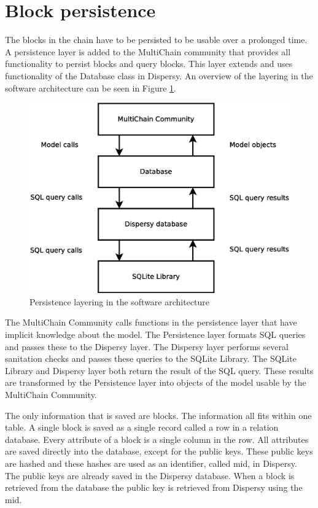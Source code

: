 \section{Block persistence}
The blocks in the chain have to be persisted to be usable over a prolonged time.
A persistence layer is added to the MultiChain community
that provides all functionality to persist blocks and query blocks.
This layer extends and uses functionality of the Database class in Dispersy.
An overview of the layering in the software architecture can be seen in Figure \ref{fig:persistence-layer}.

\begin{figure}
	\centerline{\includegraphics[scale=0.3]{design/figs/persistence-layer.eps}}
	\caption{Persistence layering in the software architecture}
	\label{fig:persistence-layer}
\end{figure}

The MultiChain Community calls functions in the persistence layer that have implicit knowledge about the model.
The Persistence layer formats SQL queries and passes these to the Dispersy layer.
The Dispersy layer performs several sanitation checks and passes these queries to the SQLite Library.
The SQLite Library and Dispersy layer both return the result of the SQL query.
These results are transformed by the Persistence layer into objects of the model usable by the MultiChain Community.

The only information that is saved are blocks.
The information all fits within one table.
A single block is saved as a single record called a row in a relation database.
Every attribute of a block is a single column in the row.
All attributes are saved directly into the database,
except for the public keys.
These public keys are hashed and these hashes are used as an identifier, called mid, in Dispersy.
The public keys are already saved in the Dispersy database.
When a block is retrieved from the database the public key is retrieved from Dispersy using the mid.

